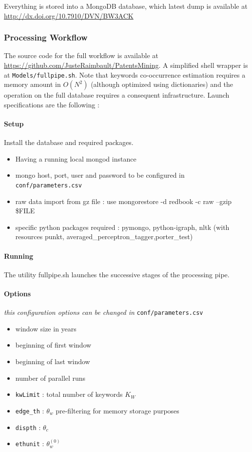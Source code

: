 \documentclass[article]{article}%
\begin{document}
Everything is stored into a MongoDB database, which latest dump is available at \url{http://dx.doi.org/10.7910/DVN/BW3ACK}

\subsubsection*{Processing Workflow}

The source code for the full workflow is available at \url{https://github.com/JusteRaimbault/PatentsMining}. A simplified shell wrapper is at \texttt{Models/fullpipe.sh}. Note that keywords co-occurrence estimation requires a memory amount in $O(N^2)$ (although optimized using dictionaries) and the operation on the full database requires a consequent infrastructure. Launch specifications are the following :

\paragraph{Setup} 

Install the database and required packages.

\begin{itemize}
\item Having a running local mongod instance
\item mongo host, port, user and password to be configured in \texttt{conf/parameters.csv}
\item raw data import from gz file : use mongorestore -d redbook -c raw --gzip {\$}FILE
\item specific python packages required : pymongo, python-igraph, nltk (with resources punkt, averaged{\_}perceptron{\_}tagger,porter{\_}test)
\end{itemize}

\paragraph{Running}

The utility fullpipe.sh launches the successive stages of the processing pipe.

\paragraph{Options}

\textit{this configuration options can be changed in }\texttt{conf/parameters.csv}

\begin{itemize}
\item window size in years
\item beginning of first window
\item beginning of last window
\item number of parallel runs
\item \texttt{kwLimit} : total number of keywords $K_W$
\item \texttt{edge{\_}th} : $\theta_w$ pre-filtering for memory storage purposes
\item \texttt{dispth} : $\theta_c$
\item \texttt{ethunit} : $\theta_w^{(0)}$
\end{itemize}
\end{document}
